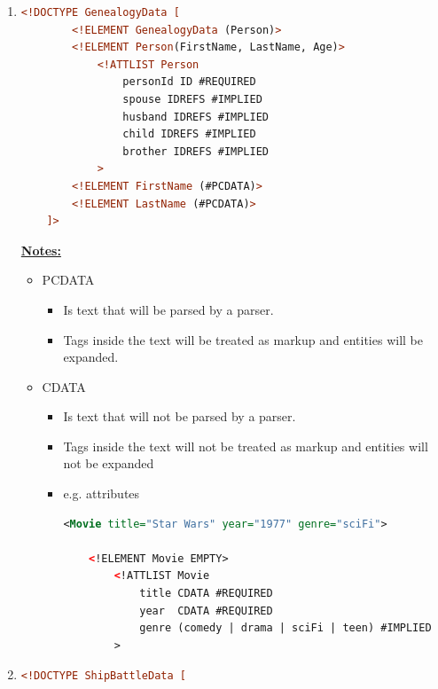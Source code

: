 \documentclass[12pt]{article}
\begin{document}
\begin{enumerate}[1.]
    \item

    \begin{lstlisting}[language=XML]
    <!DOCTYPE GenealogyData [
        <!ELEMENT GenealogyData (Person)>
        <!ELEMENT Person(FirstName, LastName, Age)>
            <!ATTLIST Person
                personId ID #REQUIRED
                spouse IDREFS #IMPLIED
                husband IDREFS #IMPLIED
                child IDREFS #IMPLIED
                brother IDREFS #IMPLIED
            >
        <!ELEMENT FirstName (#PCDATA)>
        <!ELEMENT LastName (#PCDATA)>
    ]>
    \end{lstlisting}


    \bigskip

    \underline{\textbf{Notes:}}

    \bigskip

    \begin{itemize}
        \item PCDATA
        \begin{itemize}
            \item Is text that will be parsed by a parser.
            \item Tags inside the text will be treated as markup and entities will be expanded.
        \end{itemize}
        \item CDATA
        \begin{itemize}
            \item Is text that will not be parsed by a parser.
            \item Tags inside the text will not be treated as markup and entities will not be expanded
            \item e.g. attributes

    \begin{lstlisting}[language=XML]
    <Movie title="Star Wars" year="1977" genre="sciFi">

    <!ELEMENT Movie EMPTY>
        <!ATTLIST Movie
            title CDATA #REQUIRED
            year  CDATA #REQUIRED
            genre (comedy | drama | sciFi | teen) #IMPLIED
        >

    \end{lstlisting}
        \end{itemize}
    \end{itemize}

    \item

    \begin{lstlisting}[language=XML]
    <!DOCTYPE ShipBattleData [


\end{lstlisting}
\end{enumerate}
\end{document}
